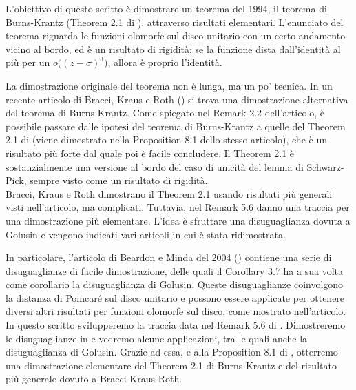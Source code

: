 L'obiettivo di questo scritto è dimostrare un teorema del 1994, il teorema di Burns-Krantz (Theorem 2.1 di \cite{BK}), attraverso risultati elementari. L'enunciato del teorema riguarda le funzioni olomorfe sul disco unitario con un certo andamento vicino al bordo, ed è un risultato di rigidità: se la funzione dista dall'identità al più per un $o\bigl((z-\sigma)^3\bigr)$, allora è proprio l'identità.

La dimostrazione originale del teorema non è lunga, ma un po' tecnica. In un recente articolo di Bracci, Kraus e Roth (\cite{BKR}) si trova una dimostrazione alternativa del teorema di Burns-Krantz. Come spiegato nel Remark 2.2 dell'articolo, è possibile passare dalle ipotesi del teorema di Burns-Krantz a quelle del Theorem 2.1 di \cite{BKR} (viene dimostrato nella Proposition 8.1 dello stesso articolo), che è un risultato più forte dal quale poi è facile concludere. Il Theorem 2.1 è sostanzialmente una versione al bordo del caso di unicità del lemma di Schwarz-Pick, sempre visto come un risultato di rigidità. \\

Bracci, Kraus e Roth dimostrano il Theorem 2.1 usando risultati più generali visti nell'articolo, ma complicati. Tuttavia, nel Remark 5.6 danno una traccia per una dimostrazione più elementare. L'idea è sfruttare una disuguaglianza dovuta a Golusin e vengono indicati vari articoli in cui è stata ridimostrata.

In particolare, l'articolo di Beardon e Minda del 2004 (\cite{BM}) contiene una serie di disuguaglianze di facile dimostrazione, delle quali il Corollary 3.7 ha a sua volta come corollario la disuguaglianza di Golusin. Queste disuguaglianze coinvolgono la distanza di Poincaré sul disco unitario e possono essere applicate per ottenere diversi altri risultati per funzioni olomorfe sul disco, come mostrato nell'articolo. \\

In questo scritto svilupperemo la traccia data nel Remark 5.6 di \cite{BKR}. Dimostreremo le disuguaglianze in \cite{BM} e vedremo alcune applicazioni, tra le quali anche la disuguaglianza di Golusin. Grazie ad essa, e alla Proposition 8.1 di \cite{BKR}, otterremo una dimostrazione elementare del Theorem 2.1 di Burns-Krantz e del risultato più generale dovuto a Bracci-Kraus-Roth.
